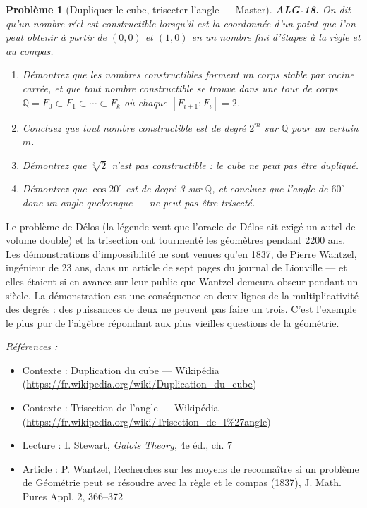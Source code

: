 \documentclass[11pt]{article}
\newtheorem{problem}{Problème}
\newenvironment{refs}{\par\small\noindent\emph{Références :}\begin{itemize}\setlength\itemsep{0pt}}{\end{itemize}\normalsize}
\begin{document}
\begin{problem}[{Dupliquer le cube, trisecter l'angle --- Master}]
\textbf{ALG-18.} On dit qu'un nombre réel est \textit{constructible} lorsqu'il est la
coordonnée d'un point que l'on peut obtenir à partir de $(0,0)$ et $(1,0)$ en un nombre fini
d'étapes à la règle et au compas.
\begin{enumerate}
\item[(i)] Démontrez que les nombres constructibles forment un corps stable
par racine carrée, et que tout nombre constructible se trouve dans une tour de corps
$\mathbb{Q} = F_0 \subset F_1 \subset \cdots \subset F_k$ où chaque
$[F_{i+1} : F_i] = 2$.
\item[(ii)] Concluez que tout nombre constructible est de degré $2^m$ sur
$\mathbb{Q}$ pour un certain $m$.
\item[(iii)] Démontrez que $\sqrt[3]{2}$ n'est pas constructible : le cube
ne peut pas être dupliqué.
\item[(iv)] Démontrez que $\cos 20^\circ$ est de degré 3 sur $\mathbb{Q}$, et
concluez que l'angle de $60^\circ$ --- donc un angle quelconque --- ne peut pas être trisecté.
\end{enumerate}

\end{problem}

\noindent Le problème de Délos (la légende veut que l'oracle de Délos ait exigé un autel de volume
double) et la trisection ont tourmenté les géomètres pendant 2200 ans. Les démonstrations d'impossibilité ne
sont venues qu'en 1837, de Pierre Wantzel, ingénieur de 23 ans, dans un article de sept pages du journal de
Liouville --- et elles étaient si en avance sur leur public que Wantzel demeura obscur pendant un siècle. La
démonstration est une conséquence en deux lignes de la multiplicativité des degrés : des puissances de deux ne
peuvent pas faire un trois. C'est l'exemple le plus pur de l'algèbre répondant aux plus vieilles questions de
la géométrie.

\begin{refs}
\item Contexte : Duplication du cube --- Wikipédia (\url{https://fr.wikipedia.org/wiki/Duplication_du_cube})
\item Contexte : Trisection de l'angle --- Wikipédia (\url{https://fr.wikipedia.org/wiki/Trisection_de_l%27angle})
\item Lecture : I. Stewart, \textit{Galois Theory}, 4e éd., ch. 7
\item Article : P. Wantzel, \og{} Recherches sur les moyens de reconnaître si un problème de Géométrie peut se résoudre avec la règle et le compas \fg{} (1837), J. Math. Pures Appl. 2, 366--372
\end{refs}
\end{document}
